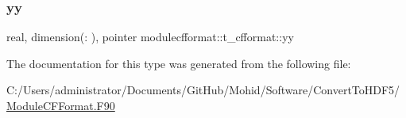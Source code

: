 \mbox{\label{structmodulecfformat_1_1t__cfformat_aa2888709db722a7aa96dd0cd01ff6ea3}} 
\subsubsection{\texorpdfstring{yy}{yy}}
{\footnotesize\ttfamily real, dimension(\+:  ), pointer modulecfformat\+::t\+\_\+cfformat\+::yy\hspace{0.3cm}{\ttfamily [private]}}



The documentation for this type was generated from the following file\+:\begin{DoxyCompactItemize}
\item 
C\+:/\+Users/administrator/\+Documents/\+Git\+Hub/\+Mohid/\+Software/\+Convert\+To\+H\+D\+F5/\mbox{\hyperlink{_module_c_f_format_8_f90}{Module\+C\+F\+Format.\+F90}}\end{DoxyCompactItemize}
